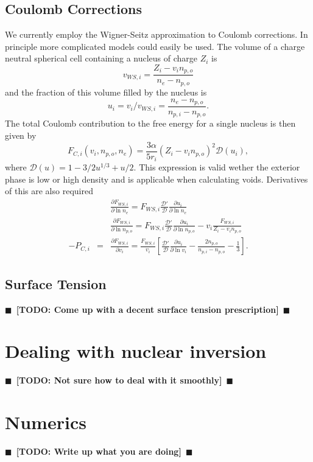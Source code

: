 \documentclass[11pt,letter]{article}
\newcommand{\pd}[2]{\frac{\partial #1}{\partial #2}}
\newcommand{\todo}[1]{{$\blacksquare$~\textbf{\color{blue}[TODO: #1]}}~$\blacksquare$}
\begin{document}
\subsection{Coulomb Corrections} 
We currently employ the Wigner-Seitz approximation to Coulomb corrections.  In
principle more complicated models could easily be used.  The volume of a charge
neutral spherical cell containing a nucleus of charge $Z_i$ is 
\begin{equation} 
v_{WS,i} = \frac{Z_i - v_i n_{p,o}}{n_e - n_{p,o}}
\end{equation}
and the fraction of this volume filled by the nucleus is 
\begin{equation}
u_i = v_i/v_{WS,i} = \frac{n_e - n_{p,o}}{n_{p,i} - n_{p,o}}. 
\end{equation} 
The total Coulomb contribution to the free energy for a single nucleus is then
given by
\begin{equation}
F_{C,i}(v_i, n_{p,o}, n_e) = \frac{3\alpha}{5 r_i} \left(Z_i - v_i n_{p,o}\right)^2 
\mathcal{D}(u_i),
\end{equation} 
where $\mathcal{D}(u) = 1 - 3/2 u^{1/3} + u/2$.  This expression is valid wether
the exterior phase is low or high density and is applicable when calculating
voids.  Derivatives of this are also required 
\begin{eqnarray}
&& \pd{F_{WS,i}}{\ln n_e} = F_{WS,i} \frac{\mathcal{D}'}{\mathcal{D}}
\pd{u_i}{\ln n_e} \\
&& \pd{F_{WS,i}}{\ln n_{p,o}} = F_{WS,i} \frac{\mathcal{D}'}{\mathcal{D}}
\pd{u_i}{\ln n_{p,o}} - v_i \frac{F_{WS,i}}{Z_i - v_i n_{p,o}}\\
-P_{C,i} &=&  \pd{F_{WS,i}}{v_i} = \frac{F_{WS,i}}{v_i} 
\left[ \frac{\mathcal{D}'}{\mathcal{D}}  \pd{u_i}{\ln v_i} 
- \frac{2n_{p,o}}{n_{p,i} - n_{p,o}} - \frac{1}{3} \right].
\end{eqnarray}
  
\subsection{Surface Tension}
\todo{Come up with a decent surface tension prescription}

\section{Dealing with nuclear inversion}
\todo{Not sure how to deal with it smoothly} 

\section{Numerics}
\todo{Write up what you are doing} 
\end{document}
